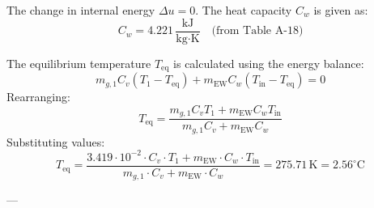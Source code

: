 The change in internal energy \( \Delta u = 0 \). The heat capacity \( C_w \) is given as:  
\[
C_w = 4.221 \, \frac{\text{kJ}}{\text{kg·K}} \quad \text{(from Table A-18)}
\]  

The equilibrium temperature \( T_{\text{eq}} \) is calculated using the energy balance:  
\[
m_{g,1} C_v (T_1 - T_{\text{eq}}) + m_{\text{EW}} C_w (T_{\text{in}} - T_{\text{eq}}) = 0
\]  
Rearranging:  
\[
T_{\text{eq}} = \frac{m_{g,1} C_v T_1 + m_{\text{EW}} C_w T_{\text{in}}}{m_{g,1} C_v + m_{\text{EW}} C_w}
\]  
Substituting values:  
\[
T_{\text{eq}} = \frac{3.419 \cdot 10^{-2} \cdot C_v \cdot T_1 + m_{\text{EW}} \cdot C_w \cdot T_{\text{in}}}{m_{g,1} \cdot C_v + m_{\text{EW}} \cdot C_w} = 275.71 \, \text{K} = 2.56^\circ \text{C}
\]  

---